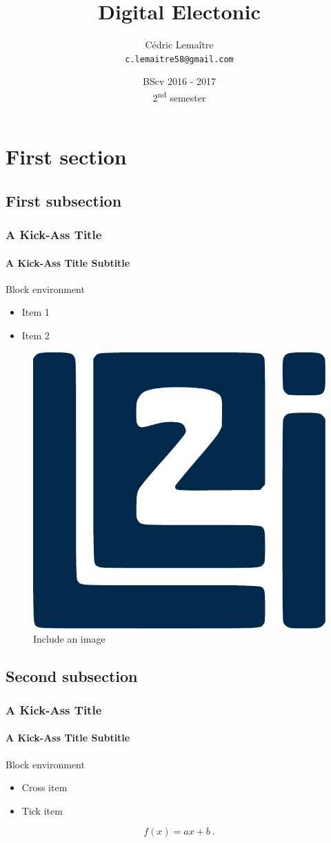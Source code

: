 \documentclass{beamer}
\title{Digital Electonic}
\author{Cédric Lemaître \\ \texttt{c.lemaitre58@gmail.com}}
\date{BScv 2016 - 2017 \\ 2\textsuperscript{nd} semester}
\institute{Universit\'e de Bourgogne}
\newcommand{\tick}{\color{green!60!black!80}\ding{51}}
\newcommand{\cross}{\color{red!60!black!80}\ding{55}}
\begin{document}
\begin{frame}
  \titlepage
\end{frame}

\begin{frame}
  \tableofcontents[sectionstyle=show,subsectionstyle=show,subsubsectionstyle=hide]
\end{frame}

\section{First section}

\subsection{First subsection}

\begin{frame}
  \frametitle{A Kick-Ass Title}
  \framesubtitle{A Kick-Ass Title Subtitle}
  \begin{block}{Block environment}
    \begin{itemize}
    \item Item 1
    \item Item 2
    \end{itemize}
  \end{block}
  \begin{figure}
    \centering
    \includegraphics[width=.2\textwidth]{./images/logos/le2i-logo.pdf}
    \caption{Include an image}
  \end{figure}
\end{frame}

\subsection{Second subsection}

\begin{frame}
  \frametitle{A Kick-Ass Title}
  \framesubtitle{A Kick-Ass Title Subtitle}
  \begin{block}{Block environment}
    \begin{itemize}
    \item[\cross] Cross item
    \item[\tick] Tick item
    \end{itemize}
  \end{block}
  \begin{equation}
    \label{eq:eq1}
    f(x)=ax+b \ .
  \end{equation}
\end{frame}
\end{document}
